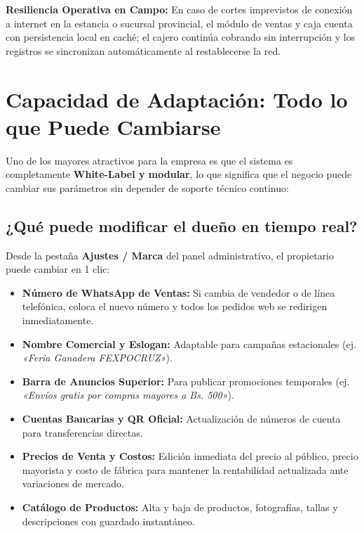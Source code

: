 \documentclass[11pt,a4paper]{article}
\begin{document}
\begin{highlightbox}
\textbf{Resiliencia Operativa en Campo:} En caso de cortes imprevistos de conexión a internet en la estancia o sucursal provincial, el módulo de ventas y caja cuenta con persistencia local en caché; el cajero continúa cobrando sin interrupción y los registros se sincronizan automáticamente al restablecerse la red.
\end{highlightbox}

\section{Capacidad de Adaptación: Todo lo que Puede Cambiarse}

Uno de los mayores atractivos para la empresa es que el sistema es completamente \textbf{White-Label y modular}, lo que significa que el negocio puede cambiar sus parámetros sin depender de soporte técnico continuo:

\subsection{¿Qué puede modificar el dueño en tiempo real?}
Desde la pestaña \textbf{Ajustes / Marca} del panel administrativo, el propietario puede cambiar en 1 clic:
\begin{itemize}
    \item \textbf{Número de WhatsApp de Ventas:} Si cambia de vendedor o de línea telefónica, coloca el nuevo número y todos los pedidos web se redirigen inmediatamente.
    \item \textbf{Nombre Comercial y Eslogan:} Adaptable para campañas estacionales (ej. \textit{«Feria Ganadera FEXPOCRUZ»}).
    \item \textbf{Barra de Anuncios Superior:} Para publicar promociones temporales (ej. \textit{«Envíos gratis por compras mayores a Bs. 500»}).
    \item \textbf{Cuentas Bancarias y QR Oficial:} Actualización de números de cuenta para transferencias directas.
    \item \textbf{Precios de Venta y Costos:} Edición inmediata del precio al público, precio mayorista y costo de fábrica para mantener la rentabilidad actualizada ante variaciones de mercado.
    \item \textbf{Catálogo de Productos:} Alta y baja de productos, fotografías, tallas y descripciones con guardado instantáneo.
\end{itemize}
\end{document}
